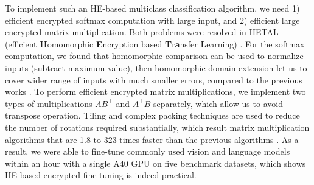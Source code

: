 \documentclass[12pt]{article}
\begin{document}
To implement such an HE-based multiclass classification algorithm, we need 1) efficient encrypted softmax computation with large input, and 2) efficient large encrypted matrix multiplication.
Both problems were resolved in HETAL (efficient \textbf{H}omomorphic \textbf{E}ncryption based \textbf{T}r\textbf{a}nsfer \textbf{L}earning) \cite{lee2023hetal}.
For the softmax computation, we found that homomorphic comparison \cite{cheon2020efficient} can be used to normalize inputs (subtract maximum value), then homomorphic domain extension \cite{cheon2022efficient} let us to cover wider range of inputs with much smaller errors, compared to the previous works \cite{jin2020secure,lee2022privacy,hong2022secure}.
To perform efficient encrypted matrix multiplications, we implement two types of multiplications $A B^\intercal$ and $A^\intercal B$ separately, which allow us to avoid transpose operation.
Tiling and complex packing techniques are used to reduce the number of rotations required substantially, which result matrix multiplication algorithms that are 1.8 to 323 times faster than the previous algorithms \cite{crockett2020low,jin2020secure}.
As a result, we were able to fine-tune commonly used vision and language models within an hour with a single A40 GPU on five benchmark datasets, which shows HE-based encrypted fine-tuning is indeed practical.




{
\scriptsize
}
\end{document}
